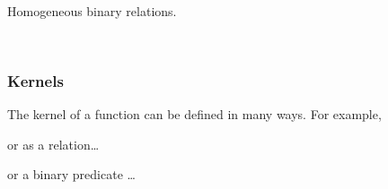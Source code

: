 \documentclass[sigplan,screen]{acmart}
\begin{document}
\begin{code}%
\>[0]\AgdaSpace{}%
\AgdaSymbol{:}\AgdaSpace{}%
\AgdaSpace{}%
\AgdaSpace{}%
\AgdaSpace{}%
\AgdaSpace{}%
\AgdaSpace{}%
\AgdaSpace{}%
\AgdaSymbol{(}\AgdaSpace{}%
\AgdaSymbol{:}\AgdaSpace{}%
\AgdaSymbol{)}\AgdaSpace{}%
\AgdaSpace{}%
\AgdaSymbol{(}\AgdaSpace{}%
\AgdaSpace{}%
\AgdaSpace{}%
\AgdaSpace{}%
\AgdaSpace{}%
\AgdaSymbol{)}\AgdaSpace{}%
\<%
\\
\>[0]\AgdaSpace{}%
\AgdaSpace{}%
\AgdaSpace{}%
\AgdaSpace{}%
\AgdaSymbol{=}\AgdaSpace{}%
\AgdaSpace{}%
\AgdaSpace{}%
\AgdaSpace{}%
\AgdaSpace{}%
\AgdaSpace{}%
\<%
\end{code}

Homogeneous binary relations.
\begin{code}%
\>[0]\AgdaSpace{}%
\AgdaSymbol{:}\AgdaSpace{}%
\AgdaSpace{}%
\AgdaSpace{}%
\AgdaSpace{}%
\AgdaSymbol{(}\AgdaSpace{}%
\AgdaSymbol{:}\AgdaSpace{}%
\AgdaSymbol{)}\AgdaSpace{}%
\AgdaSpace{}%
\AgdaSpace{}%
\AgdaSpace{}%
\AgdaSpace{}%
\AgdaSpace{}%
\<%
\\
\>[0]\AgdaSpace{}%
\AgdaSpace{}%
\AgdaSpace{}%
\AgdaSymbol{=}\AgdaSpace{}%
\AgdaSpace{}%
\AgdaSpace{}%
\AgdaSpace{}%
\<%
\end{code}

\subsubsection{Kernels}\label{kernels}
The kernel of a function can be defined in many ways. For example,
\begin{code}  \end{code}
or as a relation\ldots{}
\begin{code}  \end{code}
or a binary predicate …
\begin{code}\end{code}
\end{document}
